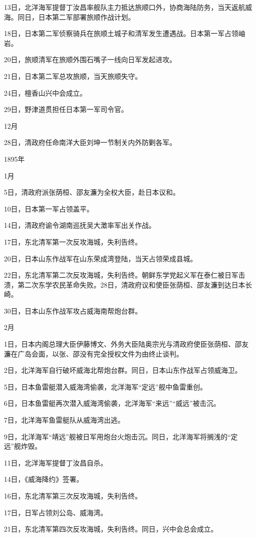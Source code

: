 \documentclass[12pt,UTF8]{ctexbook}
\begin{document}
13日，北洋海军提督丁汝昌率舰队主力抵达旅顺口外，协商海陆防务，当天返航威海。同日，日本第二军部署旅顺作战计划。

18日，日本第二军侦察骑兵在旅顺土城子和清军发生遭遇战。日本第一军占领岫岩。

20日，旅顺清军在旅顺外围石嘴子一线向日军发起进攻。

21日，日本第二军总攻旅顺，当天旅顺失守。

24日，檀香山兴中会成立。

29日，野津道贯担任日本第一军司令官。

12月

28日，清政府任命南洋大臣刘坤一节制关内外防剿各军。

1895年

1月

5日，清政府派张荫桓、邵友濂为全权大臣，赴日本议和。

10日，日本第一军占领盖平。

14日，清政府谕令湖南巡抚吴大澂率军出关作战。

17日，东北清军第一次反攻海城，失利告终。

20日，日本山东作战军在山东荣成湾登陆，当天占领荣成县城。

22日，东北清军第二次反攻海城，失利告终。朝鲜东学党起义军在泰仁被日军击溃，第二次东学农民革命失败。28日，清政府议和使臣张荫桓、邵友濂到达日本长崎。

30日，日本山东作战军攻占威海南帮炮台群。

2月

1日，日本内阁总理大臣伊藤博文、外务大臣陆奥宗光与清政府使臣张荫桓、邵友濂在广岛会面，以张、邵没有完全授权文件为由终止谈判。

2日，北洋海军自行破坏威海北帮炮台群。同日，日本山东作战军占领威海卫。

5日，日本鱼雷艇潜入威海湾偷袭，北洋海军“定远”舰中鱼雷重创。

6日，日本鱼雷艇再次潜入威海湾偷袭，北洋海军“来远”“威远”被击沉。

7日，北洋海军鱼雷艇队从威海湾出逃。

9日，北洋海军“靖远”舰被日军用炮台火炮击沉。同日，北洋海军将搁浅的“定远”舰炸毁。

11日，北洋海军提督丁汝昌自杀。

14日，《威海降约》签署。

16日，东北清军第三次反攻海城，失利告终。

17日，日军占领刘公岛、威海湾。

21日，东北清军第四次反攻海城，失利告终。同日，兴中会总会成立。
\end{document}
